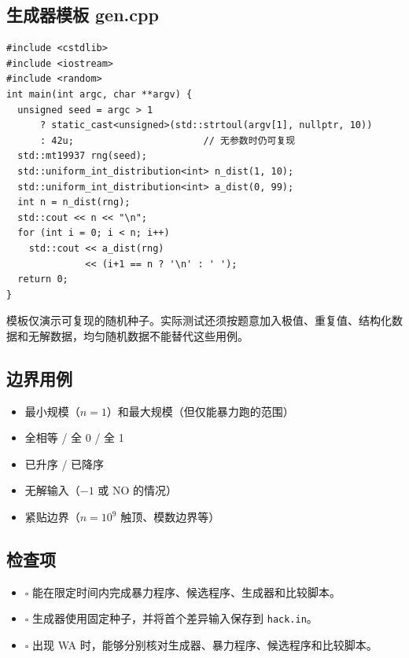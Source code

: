 \documentclass[a4paper,11pt]{article}
\newcommand{\code}[1]{\texttt{#1}}
\begin{document}
\subsection*{生成器模板 gen.cpp}

{\small
\begin{verbatim}
#include <cstdlib>
#include <iostream>
#include <random>
int main(int argc, char **argv) {
  unsigned seed = argc > 1
      ? static_cast<unsigned>(std::strtoul(argv[1], nullptr, 10))
      : 42u;                       // 无参数时仍可复现
  std::mt19937 rng(seed);
  std::uniform_int_distribution<int> n_dist(1, 10);
  std::uniform_int_distribution<int> a_dist(0, 99);
  int n = n_dist(rng);
  std::cout << n << "\n";
  for (int i = 0; i < n; i++)
    std::cout << a_dist(rng)
              << (i+1 == n ? '\n' : ' ');
  return 0;
}
\end{verbatim}}

模板仅演示可复现的随机种子。实际测试还须按题意加入极值、重复值、结构化数据和无解数据，均匀随机数据不能替代这些用例。

\subsection*{边界用例}

\begin{itemize}
  \item 最小规模（$n=1$）和最大规模（但仅能暴力跑的范围）
  \item 全相等 / 全 0 / 全 1
  \item 已升序 / 已降序
  \item 无解输入（$-1$ 或 NO 的情况）
  \item 紧贴边界（$n=10^9$ 触顶、模数边界等）
\end{itemize}

\subsection*{检查项}

\begin{itemize}
  \item $\square$ 能在限定时间内完成暴力程序、候选程序、生成器和比较脚本。
  \item $\square$ 生成器使用固定种子，并将首个差异输入保存到 \code{hack.in}。
  \item $\square$ 出现 WA 时，能够分别核对生成器、暴力程序、候选程序和比较脚本。
\end{itemize}

\newpage
\end{document}
